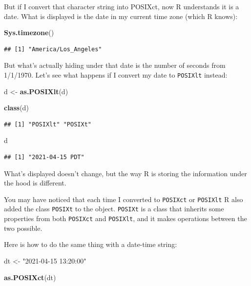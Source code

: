 \documentclass[
]{book}
\newenvironment{Shaded}{\begin{snugshade}}{\end{snugshade}}
\newcommand{\FunctionTok}[1]{\textcolor[rgb]{0.13,0.29,0.53}{\textbf{#1}}}
\newcommand{\NormalTok}[1]{#1}
\newcommand{\OtherTok}[1]{\textcolor[rgb]{0.56,0.35,0.01}{#1}}
\newcommand{\StringTok}[1]{\textcolor[rgb]{0.31,0.60,0.02}{#1}}
\begin{document}
But if I convert that character string into POSIXct, now R understands it is a date. What is displayed is the date in my current time zone (which R knows):

\begin{Shaded}
\begin{Highlighting}[]
\FunctionTok{Sys.timezone}\NormalTok{()}
\end{Highlighting}
\end{Shaded}

\begin{verbatim}
## [1] "America/Los_Angeles"
\end{verbatim}

But what's actually hiding under that date is the number of seconds from 1/1/1970. Let's see what happens if I convert my date to \texttt{POSIXlt} instead:

\begin{Shaded}
\begin{Highlighting}[]
\NormalTok{d }\OtherTok{\textless{}{-}} \FunctionTok{as.POSIXlt}\NormalTok{(d)}

\FunctionTok{class}\NormalTok{(d)}
\end{Highlighting}
\end{Shaded}

\begin{verbatim}
## [1] "POSIXlt" "POSIXt"
\end{verbatim}

\begin{Shaded}
\begin{Highlighting}[]
\NormalTok{d}
\end{Highlighting}
\end{Shaded}

\begin{verbatim}
## [1] "2021-04-15 PDT"
\end{verbatim}

What's displayed doesn't change, but the way R is storing the information under the hood is different.

You may have noticed that each time I converted to \texttt{POSIXct} or \texttt{POSIXlt} R also added the class \texttt{POSIXt} to the object. \texttt{POSIXt} is a class that inherits some properties from both \texttt{POSIXct} and \texttt{POSIXlt}, and it makes operations between the two possible.

Here is how to do the same thing with a date-time string:

\begin{Shaded}
\begin{Highlighting}[]
\NormalTok{dt }\OtherTok{\textless{}{-}} \StringTok{"2021{-}04{-}15 13:20:00"}

\FunctionTok{as.POSIXct}\NormalTok{(dt)}
\end{Highlighting}
\end{Shaded}
\end{document}
